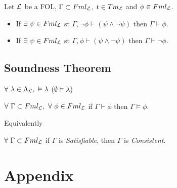 \documentclass[11pt,a4paper]{article}
\begin{document}
\proposition{}
Let $\mathcal{L}$ be a FOL, $\Gamma\subset Fml_{\mathcal{L}}$, $t\in Tm_{\mathcal{L}}$ and $\phi\in Fml_{\mathcal{L}}$.
\begin{itemize}
	\item If $\exists\ \psi\in Fml_{\mathcal{L}}$ st $\Gamma,\neg\phi\vdash(\psi\wedge\neg\psi)$ then $\Gamma\vdash\phi$.
	\item If $\exists\ \psi\in Fml_{\mathcal{L}}$ st $\Gamma,\phi\vdash(\psi\wedge\neg\psi)$ then $\Gamma\vdash\neg\phi$.
\end{itemize}








\subsection{Soundness Theorem}

\begin{center}$\forall\ \lambda\in\Lambda_{\mathcal{L}},\ \vDash \lambda$ (\ie $\emptyset\vDash\lambda$)\end{center}

\begin{center}$\forall\ \Gamma\subset Fml_\LL,\ \forall\ \phi\in Fml_\LL$ if $\Gamma\vdash\phi$ then $\Gamma\vDash\phi$.\end{center}
Equivalently
\begin{center}$\forall\ \Gamma\subset Fml_{\mathcal{L}}$ if $\Gamma$ is \textit{Satisfiable}, then $\Gamma$ is \textit{Consistent}.\end{center}

\newpage\setcounter{section}{-1}
\section{Appendix}
\end{document}
